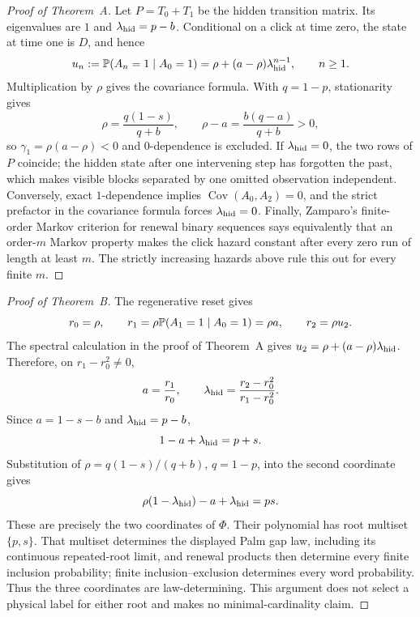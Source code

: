 \begin{proof}[Proof of Theorem~A]
Let \(P=T_0+T_1\) be the hidden transition matrix.  Its eigenvalues are
\(1\) and \(\lambda_{\rm hid}=p-b\).  Conditional on a click at time zero,
the state at time one is \(D\), and hence
\[
u_n:=\mathbb{P}(A_n=1\mid A_0=1)
=\rho+(a-\rho)\lambda_{\rm hid}^{n-1},\qquad n\ge1.
\]
Multiplication by \(\rho\) gives the covariance formula.  With
\(q=1-p\), stationarity gives
\[
\rho=\frac{q(1-s)}{q+b},\qquad
\rho-a=\frac{b(q-a)}{q+b}>0,
\]
so \(\gamma_1=\rho(a-\rho)<0\) and \(0\)-dependence is excluded.  If
\(\lambda_{\rm hid}=0\), the two rows of \(P\) coincide; the hidden state after
one intervening step has forgotten the past, which makes visible blocks
separated by one omitted observation independent.  Conversely, exact
\(1\)-dependence implies \(\operatorname{Cov}(A_0,A_2)=0\), and the strict
prefactor in the covariance formula forces \(\lambda_{\rm hid}=0\).
Finally, Zamparo's finite-order Markov criterion for renewal binary sequences
\cite{Zamparo2022RenewalBinary} says equivalently that an order-\(m\) Markov
property makes the click hazard constant after every zero run of length at
least \(m\).  The strictly increasing hazards above rule this out for every
finite \(m\).
\end{proof}

\begin{proof}[Proof of Theorem~B]
The regenerative reset gives
\[
r_0=\rho,\qquad
r_1=\rho\mathbb{P}(A_1=1\mid A_0=1)=\rho a,
\qquad r_2=\rho u_2.
\]
The spectral calculation in the proof of Theorem~A gives
\(u_2=\rho+(a-\rho)\lambda_{\rm hid}\).  Therefore, on
\(r_1-r_0^2\ne0\),
\[
a=\frac{r_1}{r_0},\qquad
\lambda_{\rm hid}=
\frac{r_2-r_0^2}{r_1-r_0^2}.
\]
Since \(a=1-s-b\) and \(\lambda_{\rm hid}=p-b\),
\[
1-a+\lambda_{\rm hid}=p+s.
\]
Substitution of \(\rho=q(1-s)/(q+b)\), \(q=1-p\), into the second coordinate
gives
\[
\rho(1-\lambda_{\rm hid})-a+\lambda_{\rm hid}=ps.
\]
These are precisely the two coordinates of \(\Phi\).  Their polynomial has
root multiset \(\{p,s\}\).  That multiset determines the displayed Palm gap
law, including its continuous repeated-root limit, and renewal products then
determine every finite inclusion probability; finite inclusion--exclusion
determines every word probability.  Thus the three coordinates are
law-determining.  This argument does not select a physical label for either
root and makes no minimal-cardinality claim.
\end{proof}

